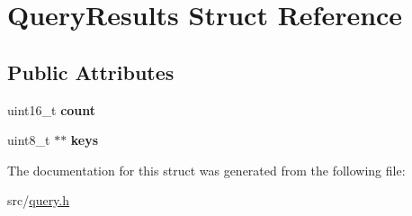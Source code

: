 \hypertarget{struct_query_results}{}\section{Query\+Results Struct Reference}
\label{struct_query_results}
\subsection*{Public Attributes}
\begin{DoxyCompactItemize}
\item 
\hypertarget{struct_query_results_aece0d4984ed5bbf86f0f6ea64450da0f}{}uint16\+\_\+t {\bfseries count}\label{struct_query_results_aece0d4984ed5bbf86f0f6ea64450da0f}

\item 
\hypertarget{struct_query_results_ad6c9da7501a132a0649659997f00a771}{}uint8\+\_\+t $\ast$$\ast$ {\bfseries keys}\label{struct_query_results_ad6c9da7501a132a0649659997f00a771}

\end{DoxyCompactItemize}


The documentation for this struct was generated from the following file\+:\begin{DoxyCompactItemize}
\item 
src/\hyperlink{query_8h}{query.\+h}\end{DoxyCompactItemize}
